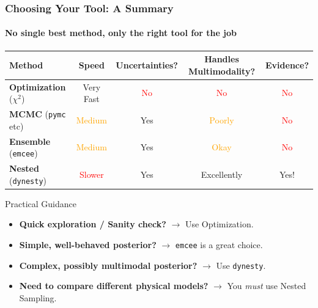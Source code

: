 \documentclass[aspectratio=169]{beamer}
\begin{document}
\begin{frame}
    \frametitle{Choosing Your Tool: A Summary}
    \framesubtitle{No single best method, only the right tool for the job}
    \begin{center}
        \begin{tabular}{|l|c|c|c|c|}
            \hline
            \textbf{Method} & \textbf{Speed} & \textbf{Uncertainties?} & \textbf{Handles Multimodality?} & \textbf{Evidence?} \\
            \hline
            \textbf{Optimization} ($\chi^2$) & \textcolor{green!50!black}{Very Fast} & \textcolor{red}{No} & \textcolor{red}{No} & \textcolor{red}{No} \\
            \hline
            \textbf{MCMC} (\texttt{pymc} etc) & \textcolor{orange}{Medium} & \textcolor{green!50!black}{Yes} & \textcolor{orange}{Poorly} & \textcolor{red}{No} \\
            \hline
            \textbf{Ensemble} (\texttt{emcee}) & \textcolor{orange}{Medium} & \textcolor{green!50!black}{Yes} & \textcolor{orange}{Okay} & \textcolor{red}{No} \\
            \hline
            \textbf{Nested} (\texttt{dynesty}) & \textcolor{red}{Slower} & \textcolor{green!50!black}{Yes} & \textcolor{green!50!black}{Excellently} & \textcolor{green!50!black}{Yes!} \\
            \hline
        \end{tabular}
    \end{center}
    \begin{block}{Practical Guidance}
        \begin{itemize}
            \item \textbf{Quick exploration / Sanity check?} $\rightarrow$ Use Optimization.
            \item \textbf{Simple, well-behaved posterior?} $\rightarrow$ \texttt{emcee} is a great choice.
            \item \textbf{Complex, possibly multimodal posterior?} $\rightarrow$ Use \texttt{dynesty}.
            \item \textbf{Need to compare different physical models?} $\rightarrow$ You \textit{must} use Nested Sampling.
        \end{itemize}
    \end{block}
\end{frame}
\end{document}
